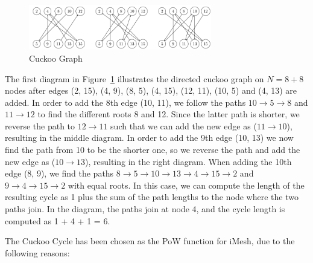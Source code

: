 \documentclass[a4paper,10pt,twocolumn]{article}
\begin{document}
\begin{figure}[ht]
	\begin{center}
	\includegraphics[width=80mm]{cuckoo.png}
	  \caption{Cuckoo Graph}
    \label{fig:cuckoo}
	\end{center}
 \end{figure}

The first diagram in Figure~\ref{fig:cuckoo} illustrates the directed cuckoo graph on \( N = 8 + 8 \) nodes after edges (2, 15), (4, 
9), (8, 5), (4, 15), (12, 11), (10, 5) and (4, 13) are added. In order to add the 8th edge (10, 11), we follow the paths \( 10 
\rightarrow 5 \rightarrow 8 \) and \( 11 \rightarrow 12 \) to find the different roots 8 and 12. Since the latter path is shorter, we 
reverse the path to \( 12 \rightarrow 11\) such that we can add the new edge as (\( 11 \rightarrow 10\)), resulting in the middle 
diagram. In order to add the 9th edge (10, 13) we now find the path from 10 to be the shorter one, so we reverse the path and add the 
new edge as (\( 10 \rightarrow 13\)), resulting in the right diagram. When adding the 10th edge (8, 9), we find the paths
 \( 8 \rightarrow 5 \rightarrow 10 \rightarrow 13 \rightarrow 4  \rightarrow 15 \rightarrow 2 \) and \( 9 \rightarrow 4 \rightarrow 15 
 \rightarrow 2 \)  with equal roots. In this case, we can compute the length of the resulting cycle as 1 plus the sum of the path lengths to the node where the two paths join. In the diagram, the paths join at node 4, and the cycle length is computed as 1 + 4 + 1 
 = 6.

The Cuckoo Cycle has been chosen as the PoW function for iMesh, due to the following reasons:
\end{document}

